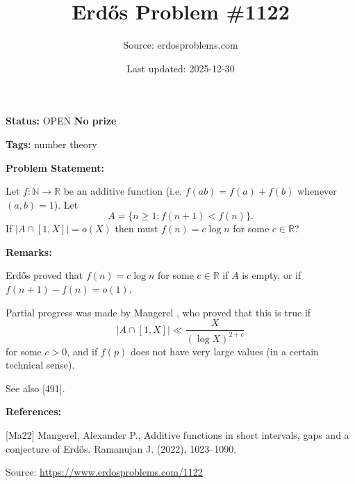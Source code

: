 \documentclass{article}
\title{Erd\H{o}s Problem \#1122}
\date{Last updated: 2025-12-30}
\author{Source: erdosproblems.com}
\begin{document}
\maketitle

\noindent\textbf{Status:} OPEN \quad \textbf{No prize}

\noindent\textbf{Tags:} number theory

\medskip
\noindent\textbf{Problem Statement:}

Let $f:\mathbb{N}\to \mathbb{R}$ be an additive function (i.e. $f(ab)=f(a)+f(b)$ whenever $(a,b)=1$). Let\[A=\{ n \geq 1: f(n+1)< f(n)\}.\]If $\lvert A\cap [1,X]\rvert =o(X)$ then must $f(n)=c\log n$ for some $c\in \mathbb{R}$?

\bigskip
\noindent\textbf{Remarks:}

Erd\H{o}s proved that $f(n)=c\log n$ for some $c\in\mathbb{R}$ if $A$ is empty, or if $f(n+1)-f(n)=o(1)$.

Partial progress was made by Mangerel \cite{Ma22}, who proved that this is true if\[\lvert A\cap [1,X]\rvert \ll \frac{X}{(\log X)^{2+c}}\]for some $c>0$, and if $f(p)$ does not have very large values (in a certain technical sense).

See also [491].

\bigskip
\noindent\textbf{References:}

[Ma22] Mangerel, Alexander P., Additive functions in short intervals, gaps and a conjecture
of {E}rd\H{o}s. Ramanujan J. (2022), 1023--1090.

\bigskip
\noindent\small{Source: \url{https://www.erdosproblems.com/1122}}
\end{document}
